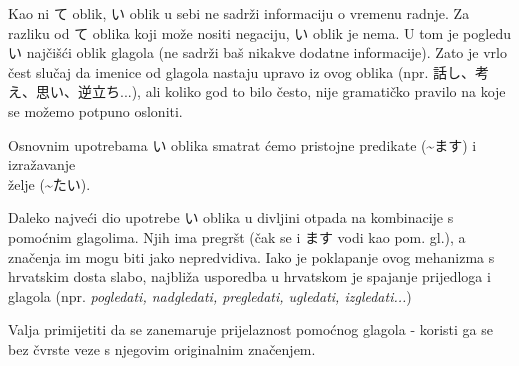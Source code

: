 
\author{Tomislav Mamić}


	
	
	Kao ni て oblik, い oblik u sebi ne sadrži informaciju o vremenu radnje. Za razliku od て oblika koji može nositi negaciju, い oblik je nema. U tom je pogledu い najčišći oblik glagola (ne sadrži baš nikakve dodatne informacije). Zato je vrlo čest slučaj da imenice od glagola nastaju upravo iz ovog oblika (npr. 話し、考え、思い、逆立ち...), ali koliko god to bilo često, nije gramatičko pravilo na koje se možemo potpuno osloniti.
	
	Osnovnim upotrebama い oblika smatrat ćemo pristojne predikate (\textasciitilde ます) i izražavanje\\ želje (\textasciitilde たい).
	
	
	Daleko najveći dio upotrebe い oblika u divljini otpada na kombinacije s pomoćnim glagolima. Njih ima pregršt (čak se i ます vodi kao pom. gl.), a značenja im mogu biti jako nepredvidiva. Iako je poklapanje ovog mehanizma s hrvatskim dosta slabo, najbliža usporedba u hrvatskom je spajanje prijedloga i glagola (npr. \textit{pogledati, nadgledati, pregledati, ugledati, izgledati...})
	
	\begin{reibun}
	\end{reibun}


	Valja primijetiti da se zanemaruje prijelaznost pomoćnog glagola - koristi ga se bez čvrste veze s njegovim originalnim značenjem.

	\begin{reibun}
	\end{reibun}


